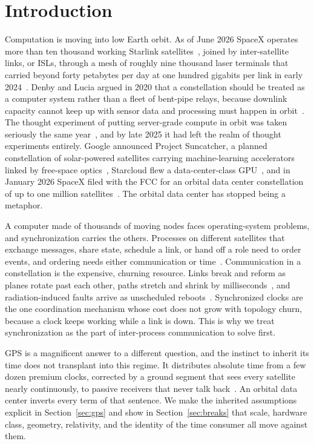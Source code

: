 \documentclass[twocolumn,10pt]{article}
\begin{document}
\section{Introduction}\label{sec:intro}
Computation is moving into low Earth orbit. As of June 2026 SpaceX operates more than ten thousand working Starlink satellites~\cite{mcdowellstats}, joined by inter-satellite links, or ISLs, through a mesh of roughly nine thousand laser terminals that carried beyond forty petabytes per day at one hundred gigabits per link in early 2024~\cite{brashears2024}. Denby and Lucia argued in 2020 that a constellation should be treated as a computer system rather than a fleet of bent-pipe relays, because downlink capacity cannot keep up with sensor data and processing must happen in orbit~\cite{denby2020}. The thought experiment of putting server-grade compute in orbit was taken seriously the same year~\cite{bhattacherjee2020}, and by late 2025 it had left the realm of thought experiments entirely. Google announced Project Suncatcher, a planned constellation of solar-powered satellites carrying machine-learning accelerators linked by free-space optics~\cite{suncatcher2025}, Starcloud flew a data-center-class GPU~\cite{starcloud2025}, and in January 2026 SpaceX filed with the FCC for an orbital data center constellation of up to one million satellites~\cite{spacenews2026}. The orbital data center has stopped being a metaphor.

A computer made of thousands of moving nodes faces operating-system problems, and synchronization carries the others. Processes on different satellites that exchange messages, share state, schedule a link, or hand off a role need to order events, and ordering needs either communication or time~\cite{lamport1978,liskov1991}. Communication in a constellation is the expensive, churning resource. Links break and reform as planes rotate past each other, paths stretch and shrink by milliseconds~\cite{kassing2020}, and radiation-induced faults arrive as unscheduled reboots~\cite{pfandzelter2023}. Synchronized clocks are the one coordination mechanism whose cost does not grow with topology churn, because a clock keeps working while a link is down. This is why we treat synchronization as the part of inter-process communication to solve first.

GPS is a magnificent answer to a different question, and the instinct to inherit its time does not transplant into this regime. It distributes absolute time from a few dozen premium clocks, corrected by a ground segment that sees every satellite nearly continuously, to passive receivers that never talk back~\cite{ashby2003,gpscontrol}. An orbital data center inverts every term of that sentence. We make the inherited assumptions explicit in Section~\ref{sec:gps} and show in Section~\ref{sec:breaks} that scale, hardware class, geometry, relativity, and the identity of the time consumer all move against them.
\end{document}
